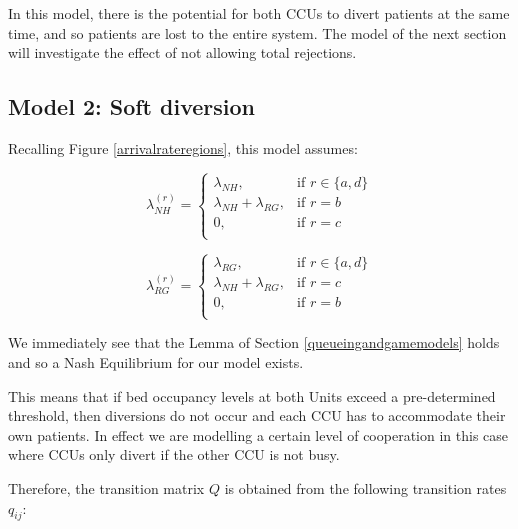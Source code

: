 \documentclass{article}
\begin{document}
In this model, there is the potential for both CCUs to divert patients at the same time, and so patients are lost to the entire system. The model of the next section will investigate the effect of not allowing total rejections.

\subsection{Model 2: Soft diversion}

Recalling Figure \ref{arrivalrateregions}, this model assumes:

\begin{minipage}[t]{0.5\textwidth}
\small{$$\lambda_{NH}^{(r)}=\begin{cases}
\lambda_{NH}, &\text{if }r\in\{a,d\}\\
\lambda_{NH}+\lambda_{RG},  &\text{if }r=b\\
0, &\text{if }r=c\\
\end{cases}$$}
\end{minipage}
\begin{minipage}[t]{0.5\textwidth}
\small{$$\lambda_{RG}^{(r)}=\begin{cases}
\lambda_{RG}, &\text{if }r\in\{a,d\}\\
\lambda_{NH}+\lambda_{RG},  &\text{if }r=c\\
0, &\text{if }r=b\\
\end{cases}$$}
\end{minipage}

We immediately see that the Lemma of Section \ref{queueingandgamemodels} holds and so a Nash Equilibrium for our model exists.

This means that if bed occupancy levels at both Units exceed a pre-determined threshold, then diversions do not occur and each CCU has to accommodate their own patients.
In effect we are modelling a certain level of cooperation in this case where CCUs only divert if the other CCU is not busy.

Therefore, the transition matrix $Q$ is obtained from the following transition rates $q_{ij}$:
\end{document}
